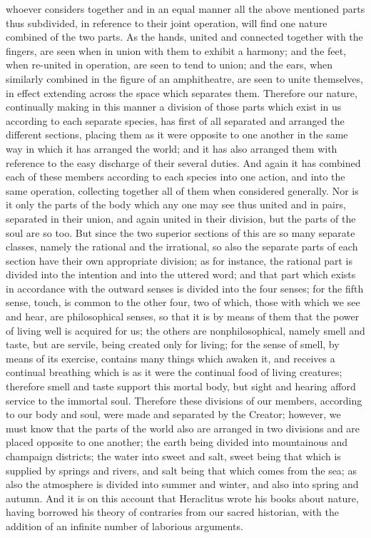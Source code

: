 whoever considers together and in an equal manner all the above mentioned parts thus subdivided,
in reference to their joint operation, will find one nature combined of the two parts. As the hands,
united and connected together with the fingers, are seen when in union with them to exhibit a
harmony; and the feet, when re-united in operation, are seen to tend to union; and the ears, when
similarly combined in the figure of an amphitheatre, are seen to unite themselves, in effect
extending across the space which separates them. Therefore our nature, continually making in this
manner a division of those parts which exist in us according to each separate species, has first of
all separated and arranged the different sections, placing them as it were opposite to one another
in the same way in which it has arranged the world; and it has also arranged them with reference to
the easy discharge of their several duties. And again it has combined each of these members
according to each species into one action, and into the same operation, collecting together all of
them when considered generally. Nor is it only the parts of the body which any one may see thus
united and in pairs, separated in their union, and again united in their division, but the parts of the
soul are so too. But since the two superior sections of this are so many separate classes, namely
the rational and the irrational, so also the separate parts of each section have their own
appropriate division; as for instance, the rational part is divided into the intention and into the
uttered word; and that part which exists in accordance with the outward senses is divided into the
four senses; for the fifth sense, touch, is common to the other four, two of which, those with which
we see and hear, are philosophical senses, so that it is by means of them that the power of living
well is acquired for us; the others are nonphilosophical, namely smell and taste, but are servile,
being created only for living; for the sense of smell, by means of its exercise, contains many things
which awaken it, and receives a continual breathing which is as it were the continual food of living
creatures; therefore smell and taste support this mortal body, but sight and hearing afford service
to the immortal soul. Therefore these divisions of our members, according to our body and soul,
were made and separated by the Creator; however, we must know that the parts of the world also
are arranged in two divisions and are placed opposite to one another; the earth being divided into
mountainous and champaign districts; the water into sweet and salt, sweet being that which is
supplied by springs and rivers, and salt being that which comes from the sea; as also the
atmosphere is divided into summer and winter, and also into spring and autumn. And it is on this
account that Heraclitus wrote his books about nature, having borrowed his theory of contraries
from our sacred historian, with the addition of an infinite number of laborious arguments.

